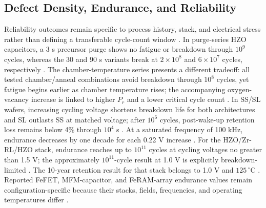 \documentclass[11pt,a4paper]{report}
\begin{document}
\subsection{Defect Density, Endurance, and Reliability}

Reliability outcomes remain specific to process history, stack, and electrical stress rather than defining a transferable cycle-count window \cite{park2022chamber,choi2025purge,kaatranen2026unif,liu2025zrrich}. In purge-series HZO capacitors, a 3 s precursor purge shows no fatigue or breakdown through $10^9$ cycles, whereas the 30 and 90 s variants break at $2\times10^8$ and $6\times10^7$ cycles, respectively \cite{choi2025purge}. The chamber-temperature series presents a different tradeoff: all tested chamber/anneal combinations avoid breakdown through $10^8$ cycles, yet fatigue begins earlier as chamber temperature rises; the accompanying oxygen-vacancy increase is linked to higher $P_r$ and a lower critical cycle count \cite{park2022chamber}. In SS/SL wafers, increasing cycling voltage shortens breakdown life for both architectures and SL outlasts SS at matched voltage; after $10^6$ cycles, post-wake-up retention loss remains below 4\% through $10^4$ s \cite{kaatranen2026unif}. At a saturated frequency of 100 kHz, endurance decreases by one decade for each 0.22 V increase \cite{liu2025zrrich}. For the HZO/Zr-RL/HZO stack, endurance reaches up to $10^{11}$ cycles at cycling voltages no greater than 1.5 V; the approximately $10^{11}$-cycle result at 1.0 V is explicitly breakdown-limited \cite{liu2025zrrich}. The 10-year retention result for that stack belongs to 1.0 V and $125\,^{\circ}\mathrm{C}$ \cite{liu2025zrrich}. Reported FeFET, MFM-capacitor, and FeRAM-array endurance values remain configuration-specific because their stacks, fields, frequencies, and operating temperatures differ \cite{liao2023postmoore}.
\end{document}
